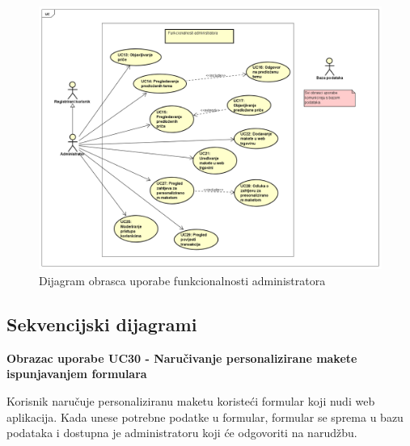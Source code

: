 					\begin{figure}
						\centering
						\includegraphics[scale=0.34]{"slike/Funkcionalnost administratora"}
						\caption{Dijagram obrasca uporabe funkcionalnosti administratora}
						\label{fig:funkcionalnost-administratora}
					\end{figure}
					
					
				\eject		
				
			\subsection{Sekvencijski dijagrami}
				
				\textbf{Obrazac uporabe UC30 - Naručivanje personalizirane makete ispunjavanjem formulara}
				
				Korisnik naručuje personaliziranu maketu koristeći formular koji nudi web aplikacija. Kada unese potrebne podatke u formular, formular se sprema u bazu podataka i dostupna je administratoru koji će odgovoriti na narudžbu.
				
